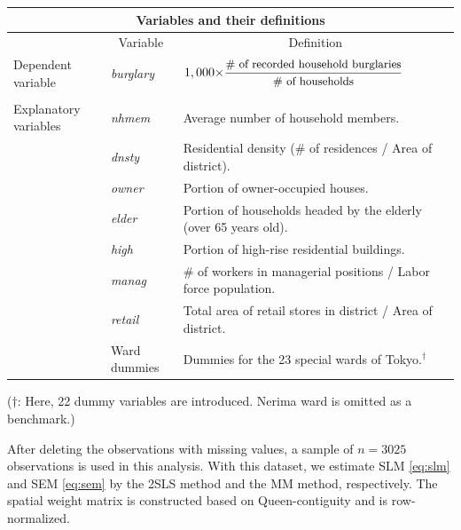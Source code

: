 \documentclass[10.5pt, A4paper, openany, uplatex]{book}
\numberwithin{equation}{section}
\begin{document}
\begin{center}
	\begin{tabular}{l|l|l}
		\multicolumn{3}{c}{ Variables and their definitions} \\ \hline\hline
				&  \multicolumn{1}{|c|}{\small Variable} &  \multicolumn{1}{|c}{\small Definition} \\ \hline
		\small Dependent variable & \small \textit{burglary} & ${\small 1,000\times }\dfrac{\text{{\small \# of recorded household burglaries}}}{\text{{\small \# of households}}}$ \\ 
		&  &  \\ 
		\small Explanatory variables & \small \textit{nhmem}  & \small Average number of household members. \\
													  & \small \textit{dnsty} & \small Residential density (\# of residences / Area of district). \\ 
		                                              & \small \textit{owner} & \small Portion of owner-occupied houses. \\
		                                              & \small \textit{elder}    & \small Portion of households headed by the elderly (over 65 years old). \\
		                                              & \small \textit{high}    & \small Portion of high-rise residential buildings. \\ 
		                                              & \small \textit{manag} & \small \# of workers in managerial positions / Labor force population. \\ 
		                                              & \small \textit{retail}      & \small Total area of retail stores in district / Area of district. \\ 
												     & \small Ward dummies & \small Dummies for the 23 special wards of Tokyo.$^\dagger$ \\ \hline
	\end{tabular}
	\begin{flushleft}
	($\dagger$: {\small Here, 22 dummy variables are introduced. Nerima ward is omitted as a benchmark.)}
	\end{flushleft}
\end{center}

After deleting the observations with missing values, a sample of $n = 3025$ observations is used in this analysis.
With this dataset, we estimate SLM \eqref{eq:slm} and SEM \eqref{eq:sem} by the 2SLS method and the MM method, respectively.
The spatial weight matrix is constructed based on Queen-contiguity and is row-normalized.
\end{document}

